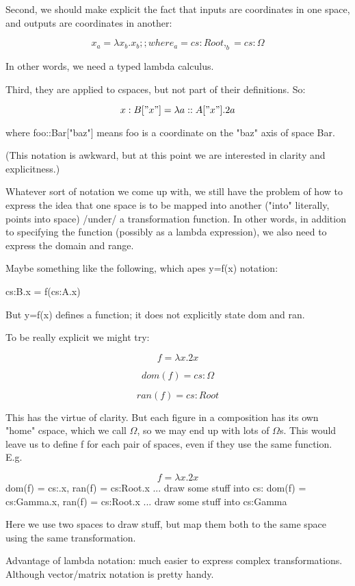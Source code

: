 \documentclass[12pt]{tufte-handout}
\numberwithin{equation}{subsection}
\numberwithin{equation}{subsection}
\begin{document}
{  Second, we should make explicit the fact that inputs are coordinates
  in one space, and outputs are coordinates in another:

  $$x_a = \lambda x_b.x_b  ;; where _a = cs:Root, _b = cs:\Omega$$

  In other words, we need a typed lambda calculus.

  Third, they are applied to cspaces, but not part of their definitions.
  So:

  \begin{equation}
    x:B["x"] = \lambda a::A["x"].2a
  \end{equation}


  where foo::Bar["baz"] means foo is a coordinate on the "baz" axis of space Bar.

  (This notation is awkward, but at this point we are interested in
  clarity and explicitness.)

  Whatever sort of notation we come up with, we still have the problem
  of how to express the idea that one space is to be mapped into another
  ("into" literally, points into space) /under/ a transformation
  function.  In other words, in addition to specifying the function
  (possibly as a lambda expression), we also need to express the domain
  and range.

  Maybe something like the following, which apes y=f(x) notation:

  cs:B.x = f(cs:A.x)

  But y=f(x) defines a function; it does not explicitly state dom and ran.

  To be really explicit we might try:

  $$f = \lambda x.2x$$

  $$dom(f) = cs:\Omega$$

  $$ran(f) = cs:Root$$

  This has the virtue of clarity.  But each figure in a composition has
  its own "home" cspace, which we call $\Omega$, so we may end up with lots
  of $\Omega$s.  This would leave us to define f for each pair of spaces,
  even if they use the same function.  E.g.


  $$f = \lambda x.2x$$
  dom(f) = cs:\Omega.x, ran(f) = cs:Root.x
  ... draw some stuff into cs:\Omega
  dom(f) = cs:Gamma.x, ran(f) = cs:Root.x
  ... draw some stuff into cs:Gamma

  Here we use two spaces to draw stuff, but map them both to the same
  space using the same transformation.

  Advantage of lambda notation: much easier to express complex
  transformations.  Although vector/matrix notation is pretty handy.

}
\end{document}
